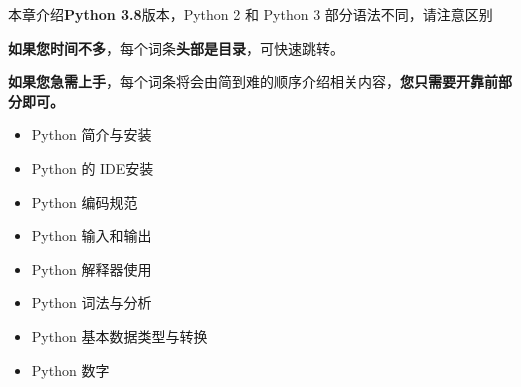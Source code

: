 
\begin{issues}
\issueTODO
\end{issues}

本章介绍\textbf{Python 3.8}版本，Python 2 和 Python 3 部分语法不同，请注意区别

\textbf{如果您时间不多}，每个词条\textbf{头部是目录}，可快速跳转。

\textbf{如果您急需上手}，每个词条将会由简到难的顺序介绍相关内容，\textbf{您只需要开靠前部分即可。}

\begin{itemize}
\item Python 简介与安装
\item Python 的 IDE安装
\item Python 编码规范
\item Python 输入和输出
\item Python 解释器使用
\item Python 词法与分析
\item Python 基本数据类型与转换
\item Python 数字
\end{itemize}
